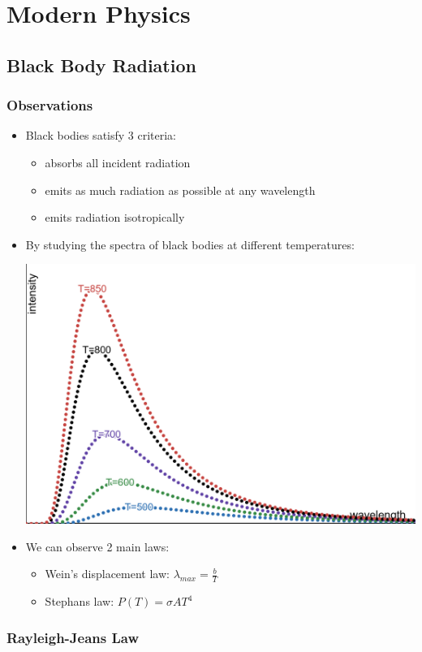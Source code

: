 \documentclass{article}
\begin{document}
\newpage
\section{Modern Physics}
\subsection{Black Body Radiation}

\subsubsection*{Observations}
\begin{itemize}
    \item Black bodies satisfy 3 criteria:
    \begin{itemize}
        \item absorbs all incident radiation
        \item emits as much radiation as possible at any wavelength
        \item emits radiation isotropically
    \end{itemize}
    \item By studying the spectra of black bodies at different temperatures:
    
    \includegraphics[width=.5\linewidth]{year1/wfmp/black body radiation/blackbody-spectra.png}
    \item We can observe 2 main laws:
    \begin{itemize}
        \item Wein's displacement law: \(\lambda_{max} = \frac{b}{T}\)
        \item Stephans law: \(P(T) = \sigma AT^4\)
    \end{itemize}
\end{itemize}

\subsubsection*{Rayleigh-Jeans Law}
\end{document}

